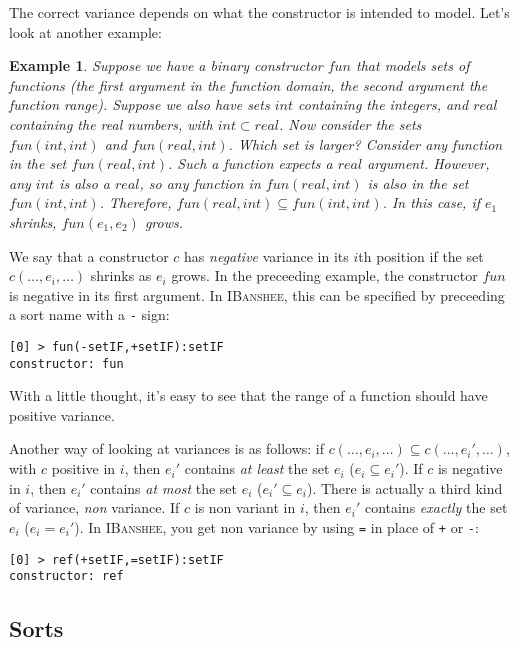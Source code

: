 \documentclass[10pt]{article}
\newcommand{\ibanshee}{\textsc{IBanshee}}
\newtheorem{example}{Example}
\begin{document}
The correct variance depends on what the constructor is intended to
model. Let's look at another example:

\begin{example}
Suppose we have a binary constructor $fun$ that models sets of
functions (the first argument in the function domain, the second
argument the function range). Suppose we also have sets $int$
containing the integers, and $real$ containing the real numbers, with
$int \subset real$. Now consider the sets $fun(int,int)$ and
$fun(real,int)$. Which set is larger? Consider any function in the set
$fun(real,int)$. Such a function expects a $real$ argument. However,
any $int$ is also a $real$, so any function in $fun(real,int)$ is also
in the set $fun(int,int)$. Therefore, $fun(real,int) \subseteq
fun(int,int)$. In this case, if $e_1$ shrinks, $fun(e_1,e_2)$ grows.
\end{example}

We say that a constructor $c$ has \emph{negative} variance in its
$i$th position if the set $c(\ldots,e_i,\ldots)$ shrinks as $e_i$
grows. In the preceeding example, the constructor $fun$ is negative in
its first argument. In \ibanshee{}, this can be specified by
preceeding a sort name with a \texttt{-} sign:

\begin{verbatim}
[0] > fun(-setIF,+setIF):setIF
constructor: fun
\end{verbatim}

With a little thought, it's easy to see that the range of a function
should have positive variance.

Another way of looking at variances is as follows: if $c(\ldots, e_i,
\ldots) \subseteq c(\ldots, e_i', \ldots)$, with $c$ positive in $i$,
then $e_i'$ contains \emph{at least} the set $e_i$ ($e_i \subseteq
e_i'$). If $c$ is negative in $i$, then $e_i'$ contains \emph{at most}
the set $e_i$ ($e_i' \subseteq e_i$). There is actually a third kind
of variance, \emph{non} variance. If $c$ is non variant in $i$, then
$e_i'$ contains \emph{exactly} the set $e_i$ ($e_i = e_i'$). In
\ibanshee{}, you get non variance by using \texttt{=} in place of
\texttt{+} or \texttt{-}:

\begin{verbatim}
[0] > ref(+setIF,=setIF):setIF
constructor: ref
\end{verbatim}

\subsection{Sorts}
\end{document}
